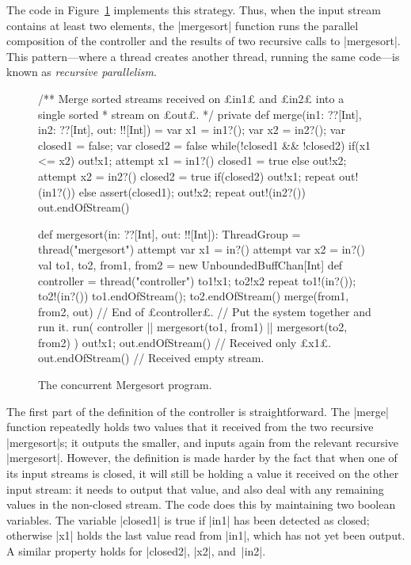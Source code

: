 The code in Figure~\ref{fig:mergesort} implements this strategy.  
Thus, when the input stream contains at least two elements, the |mergesort|
function runs the parallel composition of the controller and the results of
two recursive calls to |mergesort|.  This pattern---where a thread creates
another thread, running the same code---is known as \emph{recursive
  parallelism}.


\begin{figure}
\begin{scala}
  /** Merge sorted streams received on £in1£ and £in2£ into a single sorted
    * stream on £out£. */
  private def merge(in1: ??[Int], in2: ??[Int], out: !![Int]) = {
    var x1 = in1?(); var x2 = in2?(); var closed1 = false; var closed2 = false
    while(!closed1 && !closed2){
      if(x1 <= x2){ out!x1; attempt{ x1 = in1?() }{ closed1 = true } }
      else{ out!x2; attempt{ x2 = in2?() }{ closed2 = true } }
    }
    if(closed2){ out!x1; repeat{ out!(in1?()) } }
    else{ assert(closed1); out!x2; repeat{ out!(in2?()) } }
    out.endOfStream()
  }

  def mergesort(in: ??[Int], out: !![Int]): ThreadGroup = thread("mergesort"){
    attempt{ 
      var x1 = in?()
      attempt{
        var x2 = in?()
        val to1, to2, from1, from2 = new UnboundedBuffChan[Int]
        def controller = thread("controller"){
          to1!x1; to2!x2
          repeat{ to1!(in?()); to2!(in?()) }
          to1.endOfStream(); to2.endOfStream()
          merge(from1, from2, out)
        } // End of £controller£.
        // Put the system together and run it.
        run( controller || mergesort(to1, from1) || mergesort(to2, from2) )
      }{ out!x1; out.endOfStream() } // Received only £x1£.
    }{ out.endOfStream() } // Received empty stream.
  }
\end{scala}
\caption{The concurrent Mergesort program.}
\label{fig:mergesort}
\end{figure}

The first part of the definition of the controller is straightforward.  The
|merge| function repeatedly holds two values that it received from the two
recursive |mergesort|s; it outputs the smaller, and inputs again from the
relevant recursive |mergesort|.  However, the definition is made harder by the
fact that when one of its input streams is closed, it will still be holding a
value it received on the other input stream: it needs to output that value,
and also deal with any remaining values in the non-closed stream.  The code
does this by maintaining two boolean variables.  The variable |closed1| is
true if |in1| has been detected as closed; otherwise |x1| holds the last value
read from |in1|, which has not yet been output.  A similar property holds for
|closed2|, |x2|, and~|in2|.

